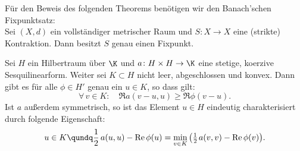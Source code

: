 Für den Beweis des folgenden Theorems benötigen wir den Banach'schen
Fixpunktsatz:\\
\nnSatz Sei $(X,d)$ ein vollständiger metrischer Raum und $S\colon X\to X$ eine
(strikte) Kontraktion. Dann besitzt $S$ genau einen Fixpunkt.

\begin{thTheorem}[Stampacchia] \label{vl13:stampacchia}
    Sei $H$ ein Hilbertraum über $\K$ und $a\colon H\times H\to\K$ eine
    stetige, koerzive Sesquilinearform. Weiter sei $K\subset H$ nicht leer,
    abgeschlossen und konvex. Dann gibt es für alle $\phi\in H'$ genau ein
    $u\in K$, so dass gilt:
    \[ \tag{$\star$} \label{vl13:star}
        \forall\,v\in K\colon\quad \Re a(v-u,u) \geq \Re\phi(v-u)  
    . \]
    Ist $a$ außerdem symmetrisch, so ist das Element $u\in H$ eindeutig
    charakterisiert durch folgende Eigenschaft:
    \[ u\in K \qundq \half\,a(u,u) - \Re\phi(u) 
        = \min_{v\in K} \, \bigl( \thalf\mkern2mu a(v,v) - \Re\phi(v) \bigr)
    . \]
\end{thTheorem}

